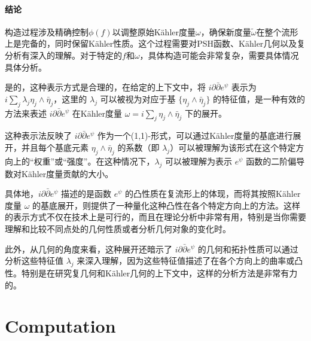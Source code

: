 \documentclass[lang=cn,zihao=-4,a4paper,fontset=none]{beautybook}
\begin{document}
\paragraph{结论}
构造过程涉及精确控制$\phi(f)$以调整原始Kähler度量$\omega$，确保新度量$\tilde{\omega}$在整个流形上是完备的，同时保留Kähler性质。这个过程需要对PSH函数、Kähler几何以及复分析有深入的理解。对于特定的$f$和$\omega$，具体构造可能会非常复杂，需要具体情况具体分析。

是的，这种表示方式是合理的，在给定的上下文中，将 $i\partial\bar{\partial} e^\psi$ 表示为 $i\sum_j \lambda_j \eta_j\wedge \bar{\eta}_j$，这里的 $\lambda_j$ 可以被视为对应于基 $\{\eta_j\wedge \bar{\eta}_j\}$ 的特征值，是一种有效的方法来表述 $i\partial\bar{\partial} e^\psi$ 在Kähler度量 $\omega = i \sum_j \eta_j \wedge \bar{\eta}_j$ 下的展开。

这种表示法反映了 $i\partial\bar{\partial} e^\psi$ 作为一个(1,1)-形式，可以通过Kähler度量的基底进行展开，并且每个基底元素 $\eta_j\wedge \bar{\eta}_j$ 的系数（即 $\lambda_j$）可以被理解为该形式在这个特定方向上的“权重”或“强度”。在这种情况下，$\lambda_j$ 可以被理解为表示 $e^\psi$ 函数的二阶偏导数对Kähler度量贡献的大小。

具体地，$i\partial\bar{\partial} e^\psi$ 描述的是函数 $e^\psi$ 的凸性质在复流形上的体现，而将其按照Kähler度量 $\omega$ 的基底展开，则提供了一种量化这种凸性在各个特定方向上的方法。这样的表示方式不仅在技术上是可行的，而且在理论分析中非常有用，特别是当你需要理解和比较不同点处的几何性质或者分析几何对象的变化时。

此外，从几何的角度来看，这种展开还暗示了 $i\partial\bar{\partial} e^\psi$ 的几何和拓扑性质可以通过分析这些特征值 $\lambda_j$ 来深入理解，因为这些特征值描述了在各个方向上的曲率或凸性。特别是在研究复几何和Kähler几何的上下文中，这样的分析方法是非常有力的。






\section{Computation}
\end{document}
